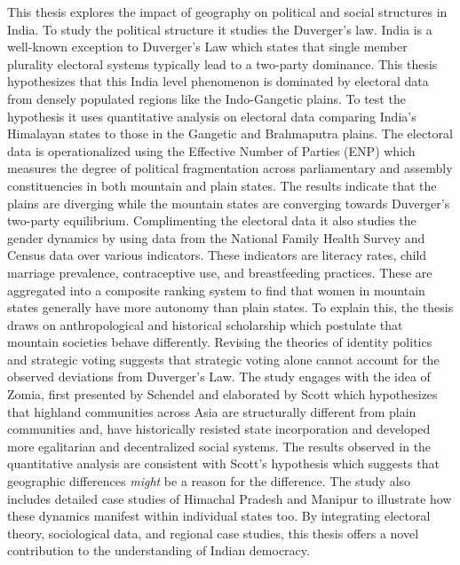This thesis explores the impact of geography on political and social structures in India. To study the political structure it studies the Duverger's law. India is a well-known exception to Duverger’s Law which states that single member plurality electoral systems typically lead to a two-party dominance. This thesis hypothesizes that this India level phenomenon is  dominated by electoral data from densely populated regions like the Indo-Gangetic plains. To test the hypothesis it uses quantitative analysis on electoral data comparing India’s Himalayan states to those in the Gangetic and Brahmaputra plains. The electoral data is operationalized using the  Effective Number of Parties (ENP) which measures the degree of political fragmentation across parliamentary and assembly constituencies in both mountain and plain states. The results indicate that the plains are diverging while the mountain states are converging towards Duverger’s two-party equilibrium. Complimenting the electoral data it also studies the gender dynamics by using data from the National Family Health Survey and Census data over various indicators. These indicators are literacy rates, child marriage prevalence, contraceptive use, and breastfeeding practices. These are aggregated into a composite ranking system to find that women in mountain states generally have more autonomy than plain states. To explain this, the thesis draws on anthropological and historical scholarship which postulate that mountain societies behave differently. Revising the theories of identity politics and strategic voting suggests that strategic voting alone cannot account for the observed deviations from Duverger’s Law. The study engages with the idea of Zomia, first presented by Schendel and elaborated by Scott which hypothesizes that highland communities across Asia are structurally different from plain communities and, have historically resisted state incorporation and developed more egalitarian and decentralized social systems.  The results observed in the quantitative analysis are consistent with Scott's hypothesis which suggests that geographic differences \textit{might} be a reason for the difference. The study also includes detailed case studies of Himachal Pradesh and Manipur to illustrate how these dynamics manifest within individual states too. By integrating electoral theory, sociological data, and regional case studies, this thesis offers a novel contribution to the understanding of Indian democracy.  